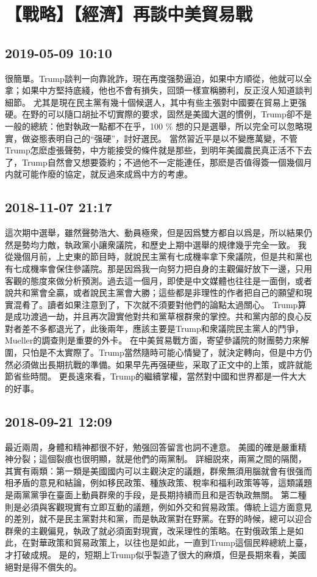 \documentclass[twocolumn]{ctexart}
\begin{document}
\section*{【戰略】【經濟】再談中美貿易戰}
\subsection*{2019-05-09 10:10}

很簡單。Trump談判一向靠訛詐，現在再度强勢逼迫，如果中方順從，他就可以全拿；如果中方堅持底綫，他也不會有損失，回頭一樣宣稱勝利，反正沒人知道談判細節。 
尤其是現在民主黨有幾十個候選人，其中有些主張對中國要在貿易上更强硬。在野的可以隨口胡扯不切實際的要求，固然是美國大選的慣例，Trump卻不是一般的總統：他對執政一點都不在乎，100 \% 想的只是選舉，所以完全可以忽略現實，做姿態表明自己的“强硬”，討好選民。 
當然習近平是以不變應萬變，不管Trump怎麽虛張聲勢，中方能接受的條件就是那些，到明年美國農民真正活不下去了，Trump自然會又想要簽約；不過他不一定能連任，那麽是否值得簽一個幾個月内就可能作廢的協定，就反過來成爲中方的考慮。
\subsection*{2018-11-07 21:17}

這次期中選舉，雖然聲勢浩大、動員極衆，但是因爲雙方都自以爲是，所以結果仍然是勢均力敵，執政黨小讓衆議院，和歷史上期中選舉的規律幾乎完全一致。
我從幾個月前，上史東的節目時，就說民主黨有七成機率拿下衆議院，但是共和黨也有七成機率會保住參議院。那是因爲我一向努力把自身的主觀偏好放下一邊，只用客觀的態度來做分析預測。過去這一個月，即使是中文媒體也往往是一面倒，或者說共和黨會全贏，或者說民主黨會大勝；這些都是非理性的作者把自己的願望和現實混肴了。讀者如果注意到了，下次就不須要對他們的論點太過關心。
Trump算是成功渡過一劫，并且再次證實他對共和黨草根群衆的掌控。共和黨内部的良心反對者差不多都退光了，此後兩年，應該主要是Trump和衆議院民主黨人的鬥爭，Mueller的調查則是重要的外卡。
在中美貿易戰方面，寄望參議院的財團勢力來解圍，只怕是不太實際了。Trump當然隨時可能心情變了，就決定轉向，但是中方仍然必須做出長期抗戰的準備。如果早先再强硬些，采取了正文中的上策，或許就能節省些時間。
更長遠來看，Trump的繼續掌權，當然對中國和世界都是一件大大的好事。
\subsection*{2018-09-21 12:09}

最近兩周，身體和精神都很不好，勉强回答留言也詞不達意。
美國的確是嚴重精神分裂；這個裂痕也很明顯，就是他們的兩黨制。
詳細説來，兩黨之間的隔閡，其實有兩類：第一類是美國國内可以主觀決定的議題，群衆無須用腦就會有很强而相矛盾的意見和結論，例如移民政策、種族政策、稅率和福利政策等等，這類議題是兩黨黨爭在臺面上動員群衆的手段，是長期持續而且和是否執政無關。
第二種則是必須與客觀現實有立即互動的議題，例如外交和貿易政策。傳統上這方面意見的差別，就不是民主黨對共和黨，而是執政黨對在野黨。在野的時候，總可以迎合群衆的主觀偏見，執政了就必須面對現實，改采理性的策略。在對俄政策上是如此，在對華政策和貿易政策上，以往也是如此，一直到Trump這個民粹總統上臺，才打破成規。
是的，短期上Trump似乎製造了很大的麻煩，但是長期來看，美國絕對是得不償失的。
\end{document}
